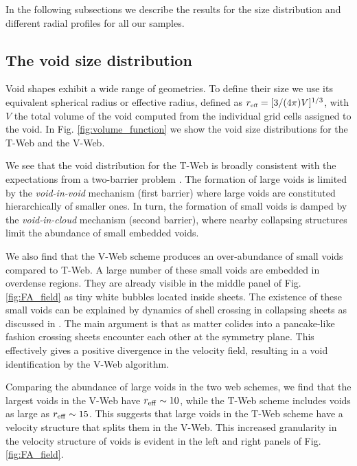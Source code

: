 \documentclass[a4,useAMS,usenatbib,usegraphicx]{mn2e}
\newcommand{\hMpc}{{\ifmmode{h^{-1}{\rm Mpc}}\else{$h^{-1}$Mpc}\fi}}
\newcommand{\reff}{{\ifmmode{r_{\mbox{\tiny eff}}}\else{$r_{\mbox{\tiny eff}}$}\fi}}
\begin{document}
In the following subsections we describe the results for the size
distribution and different radial profiles for all our samples.

\subsection{The void size distribution}
\label{subsec:shape_voids}

Void shapes exhibit a wide range of geometries.
To define their size we use its equivalent spherical radius or
effective radius, defined as $\reff = [3/(4\pi)V]^{1/3}$, with $V$ the 
total volume of the void computed from the individual grid cells
assigned to the void.   
In Fig. \ref{fig:volume_function} we show the void size
distributions for the T-Web and the V-Web.

We see that the void distribution for the T-Web is broadly consistent with the
expectations from a two-barrier problem  \citep{Sheth04}. 
The formation of large voids is limited by the \textit{void-in-void}
mechanism (first barrier) where large voids are constituted
hierarchically of smaller ones. 
In turn, the formation of small voids is damped by the
\textit{void-in-cloud} mechanism (second barrier),  where nearby
collapsing structures limit the abundance of small embedded voids.  

We also find that the V-Web scheme produces an over-abundance of small
voids compared to T-Web.
A large number of these small voids are embedded in overdense regions. 
They are already visible in the middle panel of Fig. \ref{fig:FA_field} as
tiny white bubbles located inside sheets.
The existence of these small voids can be explained by
dynamics of shell crossing in collapsing sheets as discussed in
\citet{Hoffman12}.    
The main argument is that as matter colides into a pancake-like
fashion crossing sheets encounter each other at the symmetry plane.
This effectively gives a positive divergence in the velocity
field, resulting in a void identification by the V-Web algorithm. 


Comparing the abundance of large voids in the two web schemes, we find
that the largest voids in the V-Web have $r_{\rm eff}\sim 10$\hMpc,
while the T-Web scheme includes voids as large as $r_{\rm eff}\sim 15$\hMpc. 
This suggests that large voids in the T-Web scheme have a velocity
structure that splits them in the V-Web. 
This increased granularity in the velocity structure of voids is
evident in the left and right panels of Fig. \ref{fig:FA_field}. 
\end{document}

